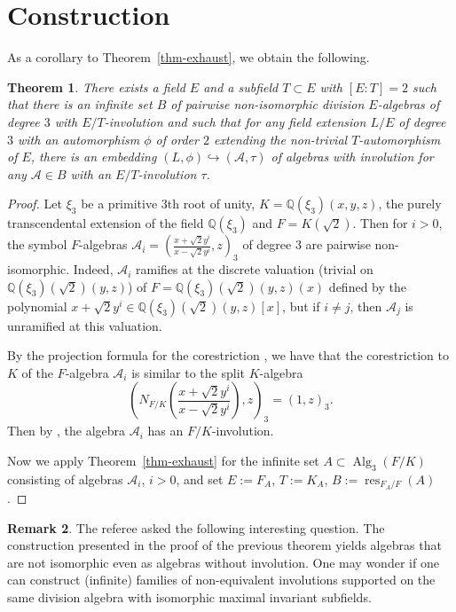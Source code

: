 \documentclass[10pt]{article}
\newtheorem{theorem}{Theorem}[section]
\theoremstyle{definition}
\newtheorem{remark}[theorem]{Remark}
\DeclareMathOperator{\res}{res}
\DeclareMathOperator{\Alg}{Alg}
\newcommand{\A}{\mathcal A}
\newcommand{\sourcepage}[1]{\label{source-page-#1}}
\begin{document}
\section{Construction}
As a corollary to Theorem~\ref{thm-exhaust}, we obtain the following.
\begin{theorem}\label{thm-construction}
There exists a field $E$ and a subfield $T\subset E$ with $[E:T]=2$ such that there is an infinite set $B$ of pairwise non-isomorphic division $E$-algebras of degree $3$ with $E/T$-involution and such that for any field extension $L/E$ of degree $3$ with an automorphism $\phi$ of order $2$ extending the non-trivial $T$-automorphism of $E$, there is an embedding $(L,\phi)\hookrightarrow(\A,\tau)$ of algebras with involution for any $\A\in B$ with an $E/T$-involution $\tau$.
\end{theorem}
\newpage
\sourcepage{9}
\begin{proof}
Let $\xi_3$ be a primitive $3$th root of unity, $K=\mathbb Q(\xi_3)(x,y,z)$, the purely transcendental extension of the field $\mathbb Q(\xi_3)$ and $F=K(\sqrt2)$. Then for $i>0$, the symbol $F$-algebras $\A_i=(\frac{x+\sqrt2y^i}{x-\sqrt2y^i},z)_3$ of degree $3$ are pairwise non-isomorphic. Indeed, $\A_i$ ramifies at the discrete valuation (trivial on $\mathbb Q(\xi_3)(\sqrt2)(y,z)$) of $F=\mathbb Q(\xi_3)(\sqrt2)(y,z)(x)$ defined by the polynomial $x+\sqrt2y^i\in\mathbb Q(\xi_3)(\sqrt2)(y,z)[x]$, but if $i\neq j$, then $\A_j$ is unramified at this valuation.

By the projection formula for the corestriction \cite[Th. 3.2]{r9}, we have that the corestriction to $K$ of the $F$-algebra $\A_i$ is similar to the split $K$-algebra
\[
\left(N_{F/K}\left(\frac{x+\sqrt2y^i}{x-\sqrt2y^i}\right),z\right)_3=(1,z)_3.
\]
Then by \cite[Th. 3.1 (2)]{r3}, the algebra $\A_i$ has an $F/K$-involution.

Now we apply Theorem~\ref{thm-exhaust} for the infinite set $A\subset\Alg_3(F/K)$ consisting of algebras $\A_i$, $i>0$, and set $E:=F_A$, $T:=K_A$, $B:=\res_{F_A/F}(A)$.
\end{proof}
\begin{remark}
The referee asked the following interesting question. The construction presented in the proof of the previous theorem yields algebras that are not isomorphic even as algebras without involution. One may wonder if one can construct (infinite) families of non-equivalent involutions supported on the same division algebra with isomorphic maximal invariant subfields.
\end{remark}
\end{document}
